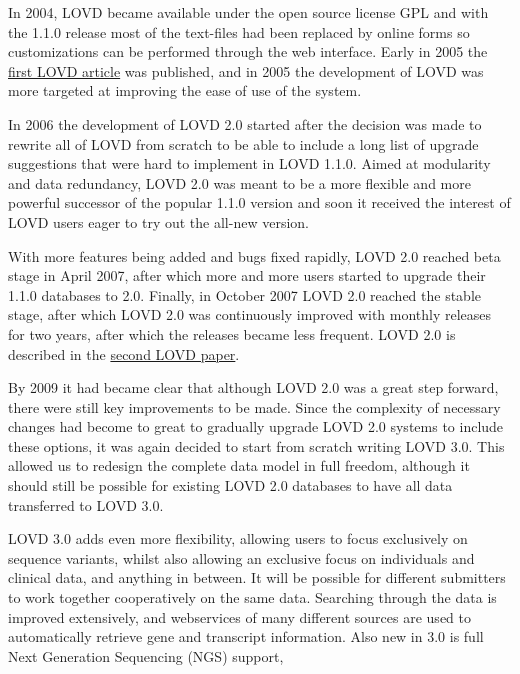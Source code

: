 \documentclass[a4paper,oneside,openany,12pt]{memoir}
\begin{document}
\par
In 2004, LOVD became available under the open source license GPL and with the 1.1.0 release most of the text-files had been replaced by online forms
so customizations can be performed through the web interface.
Early in 2005 the \href{http://www.ncbi.nlm.nih.gov/pubmed/15977173}{first LOVD article} was published,
and in 2005 the development of LOVD was more targeted at improving the ease of use of the system.
\\
\par
In 2006 the development of LOVD 2.0 started after the decision was made to rewrite all of LOVD from scratch
to be able to include a long list of upgrade suggestions that were hard to implement in LOVD 1.1.0.
Aimed at modularity and data redundancy, LOVD 2.0 was meant to be a more flexible and more powerful successor of the popular 1.1.0 version
and soon it received the interest of LOVD users eager to try out the all-new version.
\par
With more features being added and bugs fixed rapidly, LOVD 2.0 reached beta stage in April 2007,
after which more and more users started to upgrade their 1.1.0 databases to 2.0.
Finally, in October 2007 LOVD 2.0 reached the stable stage, after which LOVD 2.0 was continuously improved with monthly releases for two years,
after which the releases became less frequent.
LOVD 2.0 is described in the \href{http://www.ncbi.nlm.nih.gov/pubmed/21520333}{second LOVD paper}.
\\
\par
By 2009 it had became clear that although LOVD 2.0 was a great step forward, there were still key improvements to be made.
Since the complexity of necessary changes had become to great to gradually upgrade LOVD 2.0 systems to include these options,
it was again decided to start from scratch writing LOVD 3.0.
This allowed us to redesign the complete data model in full freedom,
although it should still be possible for existing LOVD 2.0 databases to have all data transferred to LOVD 3.0.
\par
LOVD 3.0 adds even more flexibility, allowing users to focus exclusively on sequence variants,
whilst also allowing an exclusive focus on individuals and clinical data, and anything in between.
It will be possible for different submitters to work together cooperatively on the same data.
Searching through the data is improved extensively,
and webservices of many different sources are used to automatically retrieve gene and transcript information.
Also new in 3.0 is full Next Generation Sequencing (NGS) support,
\end{document}
